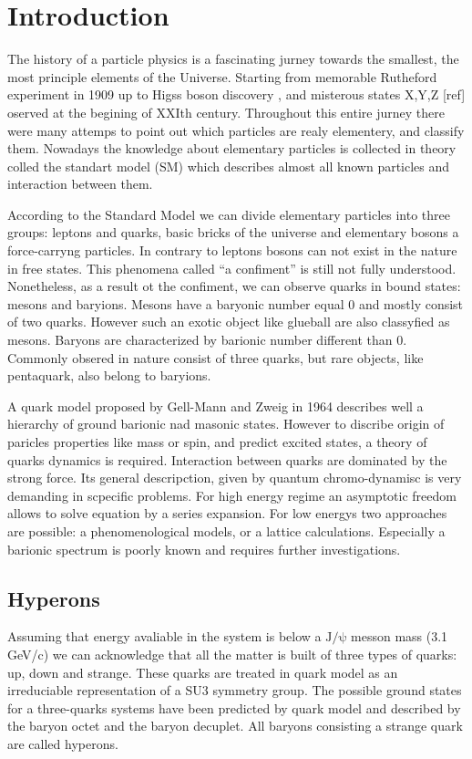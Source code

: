 \chapter{Introduction}
\label{chapter:introduction}
The history of a particle physics is a fascinating jurney towards the smallest, the most principle elements of the Universe. Starting from memorable Rutheford experiment in 1909 \cite{Rutheford} up to Higss boson discovery \cite{Higgs_CMS, Higgs_ATLAS}, and misterous states X,Y,Z [ref] oserved at the begining of XXIth century. Throughout this entire jurney there were many attemps to point out which particles are realy elementery, and classify them. Nowadays the knowledge about elementary particles is collected in theory colled the standart model (SM) which describes almost all known particles and interaction between them.

According to the Standard Model we can divide elementary particles into three groups: leptons and quarks, basic bricks of the universe and elementary bosons a force-carryng particles. In contrary to leptons bosons can not exist in the nature in free states. This phenomena called ``a confiment'' is still not fully understood. Nonetheless, as a result ot the confiment, we can observe quarks in bound states: mesons and baryions. Mesons have a baryonic number equal 0 and mostly consist of two quarks. However such an exotic object like glueball are also classyfied as mesons. Baryons are characterized by barionic number different than 0. Commonly obsered in nature consist of three quarks, but rare objects, like pentaquark, also belong to baryions.

A quark model proposed by Gell-Mann and Zweig in 1964 \cite{Gell-Mann,Zweig} describes well a hierarchy of ground barionic nad masonic states. However to discribe origin of paricles properties like mass or spin, and predict excited states, a theory of quarks dynamics is required. Interaction between quarks are dominated by the strong force. Its general descripction, given by quantum chromo-dynamisc is very demanding in scpecific problems. For high energy regime an asymptotic freedom allows to solve equation by a series expansion. For low energys two approaches are possible: a phenomenological models, or a lattice calculations. Especially a barionic spectrum is poorly known and requires further investigations.



\section{Hyperons}
Assuming that energy avaliable in the system is below a  $\mathrm{J/\psi}$ messon mass (3.1 GeV/c) we can acknowledge that all the matter is built of three types of quarks: up, down and strange. These quarks are treated in quark model as an irreduciable representation of a SU3 symmetry group. The possible ground states for a three-quarks systems have been predicted by quark model and described by the baryon octet and the baryon decuplet. All baryons consisting a strange quark are called hyperons.  

